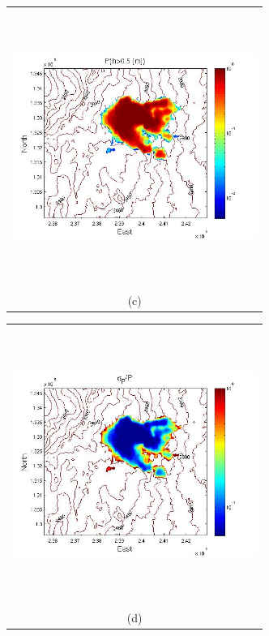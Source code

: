 \documentclass[12pt]{article}
\newcommand{\Pic}[2][0.85]{\begin{center}\texttt{[image: \#2]}
 \end{center} }
\begin{document}
\begin{figure}[H]
\begin{minipage}{0.6\textwidth}
    \end{minipage} 
        \begin{minipage}[b]{0.6\textwidth}
        \begin{tabular}{c}
       \includegraphics[width=8cm,height=9cm,keepaspectratio]{Galeras_3_P_5m.jpg}\\
        (c)
        \end{tabular}
    \end{minipage}
    \begin{minipage}{0.6\textwidth}
        \begin{tabular}{c}
	\includegraphics[width=8cm,height=9cm,keepaspectratio]{Galeras_3_sigma_5m.jpg}\\
        (d)
        \end{tabular}

\end{minipage}
\end{figure}
\end{document}
